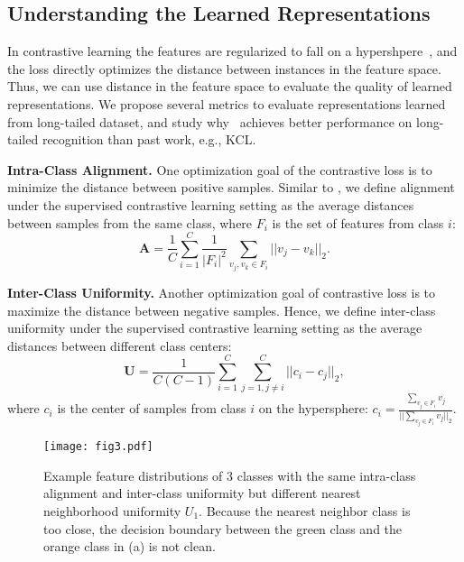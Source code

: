 \subsection{Understanding the Learned Representations}
\label{subsec:metrics}
In contrastive learning the features are regularized to fall on a hypershpere~\cite{chen2020simple,he2020momentum}, and the loss directly optimizes the distance between instances in the feature space. Thus, we can use distance in the feature space to evaluate the quality of learned representations. We propose several metrics to evaluate representations learned from long-tailed dataset, and study why \name~achieves better performance on long-tailed recognition than past work, e.g., KCL.

\textbf{Intra-Class Alignment.} One optimization goal of the contrastive loss is to minimize the distance between positive samples. Similar to \cite{wang2020understanding}, we define alignment under the supervised contrastive learning setting as the average distances between samples from the same class, where $F_i$ is the set of features from class $i$:
\begin{equation}
    \textbf{A}=\frac{1}{C}\sum_{i=1}^C \frac{1}{|F_i|^2}\sum_{v_j, v_k\in F_i}||v_j-v_k||_2.
\end{equation}

\textbf{Inter-Class Uniformity.} Another optimization goal of contrastive loss is to maximize the distance between negative samples. Hence, we define inter-class uniformity under the supervised contrastive learning setting as the average distances between different class centers:
\begin{equation}
    \textbf{U}=\frac{1}{C(C-1)}\sum_{i=1}^C\sum_{j=1, j\neq i}^C||c_i-c_j||_2,
\end{equation}
where $c_i$ is the center of samples from class $i$ on the hypersphere: $c_i = \frac{\sum\limits_{v_j \in F_i} v_j}{||\sum\limits_{v_j \in F_i} v_j||_2}$.

\begin{figure}[t]
\begin{center}
\texttt{[image: fig3.pdf]}
\end{center}
\vspace{-5pt}
\caption{\small
Example feature distributions of 3 classes with the same intra-class alignment and inter-class uniformity but different nearest neighborhood uniformity $U_1$. Because the nearest neighbor class is too close, the decision boundary between the green class and the orange class in (a) is not clean.}
\label{fig:balance}
\vspace{-10pt}
\end{figure}

